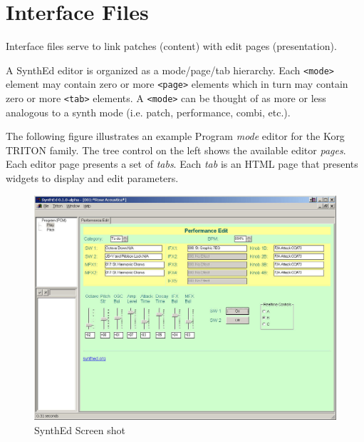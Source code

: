 \documentclass[a4paper,twoside,12pt]{article}
\newcommand{\code}[1]{\color{red}\texttt{#1}\color{black}}
\begin{document}
\newpage
\section{Interface Files}\label{interface_files}
Interface files serve to link patches (content) with edit pages
(presentation).

A SynthEd editor is organized as a mode/page/tab hierarchy. Each
\code{<mode>}{} element may contain zero or more \code{<page>}{}
elements which in turn may contain zero or more \code{<tab>}{}
elements. A \code{<mode>}{} can be thought of as more or less
analogous to a synth mode (i.e. patch, performance, combi, etc.).

The following figure illustrates an example Program {\it mode}
editor for the Korg TRITON family. The tree control on the left
shows the available editor {\it pages}. Each editor page presents
a set of {\it tabs}. Each {\it tab} is an HTML page that presents
widgets to display and edit parameters.

\label{html_ui}
\begin{figure}[!h]
\includegraphics[scale=0.15]{html_ui.jpg}
\caption{SynthEd Screen shot}
\end{figure}
\end{document}
